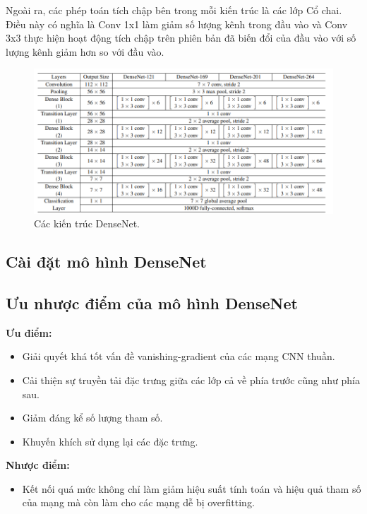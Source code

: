 Ngoài ra, các phép toán tích chập bên trong mỗi kiến trúc là các lớp Cổ chai. Điều này có nghĩa là Conv 1x1 làm giảm số lượng kênh trong đầu vào và Conv 3x3 thực hiện hoạt động tích chập trên phiên bản đã biến đổi của đầu vào với số lượng kênh giảm hơn so với đầu vào.
\begin{figure}[H]
	\centering
	\includegraphics[width=1\linewidth]{images/densenet_archtectures_for_imagenet}
	\caption{Các kiến trúc DenseNet.}
	\label{fig:densenet_archtectures_for_imagenet}
\end{figure}

\subsection{Cài đặt mô hình DenseNet}


\subsection{Ưu nhược điểm của mô hình DenseNet}
\textbf{Ưu điểm:}
\begin{itemize}
	\item Giải quyết khá tốt vấn đề vanishing-gradient của các mạng CNN thuần.
	\item Cải thiện sự truyền tải đặc trưng giữa các lớp cả về phía trước cũng như phía sau.
	\item Giảm đáng kể số lượng tham số.
	\item Khuyến khích sử dụng lại các đặc trưng.
\end{itemize}
\textbf{Nhược điểm:}
\begin{itemize}
	\item Kết nối quá mức không chỉ làm giảm hiệu suất tính toán và hiệu quả tham số của mạng mà còn làm cho các mạng dễ bị overfitting. \cite{densenet_disadvantage}
\end{itemize}